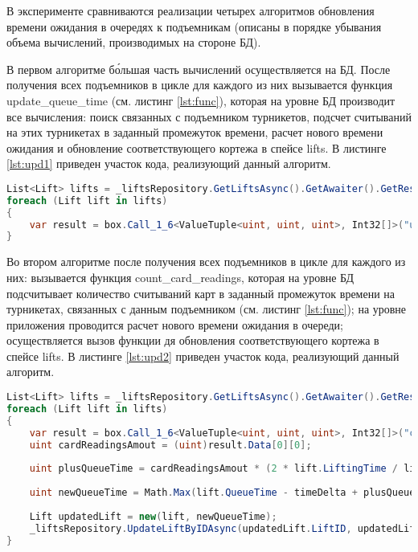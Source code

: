 В эксперименте сравниваются реализации четырех алгоритмов обновления времени ожидания в очередях к подъемникам (описаны в порядке убывания объема вычислений, производимых на стороне БД).

В первом алгоритме б\'{о}льшая часть вычислений осуществляется на БД. После получения всех подъемников в цикле для каждого из них вызывается функция update\_queue\_time (см. листинг \ref{lst:func}), которая на уровне БД производит все вычисления: поиск связанных с подъемником турникетов, подсчет считываний на этих турникетах в заданный промежуток времени,  расчет нового времени ожидания и обновление соответствующего кортежа в спейсе lifts. В листинге \ref{lst:upd1} приведен участок кода, реализующий данный алгоритм.

\captionsetup{justification=centering,singlelinecheck=off}
\begin{lstlisting}[label=lst:upd1, caption=Первый алгоритм обновления времени ожидания в очередях к подъемникам, language=csharp]
List<Lift> lifts = _liftsRepository.GetLiftsAsync().GetAwaiter().GetResult(); 
foreach (Lift lift in lifts)
{
	var result = box.Call_1_6<ValueTuple<uint, uint, uint>, Int32[]>("update_queue_time", (ValueTuple.Create(lift.LiftID, (uint)dateFrom.ToUnixTimeSeconds(), (uint)dateTo.ToUnixTimeSeconds()))).GetAwaiter().GetResult();
}
\end{lstlisting}

Во втором алгоритме после получения всех подъемников в цикле для каждого из них: вызывается функция count\_card\_readings, которая на уровне БД подсчитывает количество считываний карт в заданный промежуток времени на турникетах, связанных с данным подъемником (см. листинг \ref{lst:func}); на уровне приложения проводится расчет нового времени ожидания в очереди; осуществляется вызов функции дя обновления соответствующего кортежа в спейсе lifts. В листинге \ref{lst:upd2} приведен участок кода, реализующий данный алгоритм.

\captionsetup{justification=centering,singlelinecheck=off}
\begin{lstlisting}[label=lst:upd2, caption=Второй алгоритм обновления времени ожидания в очередях к подъемникам, language=csharp]
List<Lift> lifts = _liftsRepository.GetLiftsAsync().GetAwaiter().GetResult();
foreach (Lift lift in lifts)
{
	var result = box.Call_1_6<ValueTuple<uint, uint, uint>, Int32[]>("count_card_readings", (ValueTuple.Create(lift.LiftID, (uint)dateFrom.ToUnixTimeSeconds(), (uint)dateTo.ToUnixTimeSeconds()))).GetAwaiter().GetResult();
	uint cardReadingsAmout = (uint)result.Data[0][0];
	
	uint plusQueueTime = cardReadingsAmout * (2 * lift.LiftingTime / lift.SeatsAmount);
	
	uint newQueueTime = Math.Max(lift.QueueTime - timeDelta + plusQueueTime, 0);
	
	Lift updatedLift = new(lift, newQueueTime);
	_liftsRepository.UpdateLiftByIDAsync(updatedLift.LiftID, updatedLift.LiftName, updatedLift.IsOpen, updatedLift.SeatsAmount, updatedLift.LiftingTime).GetAwaiter().GetResult();
}
\end{lstlisting}



